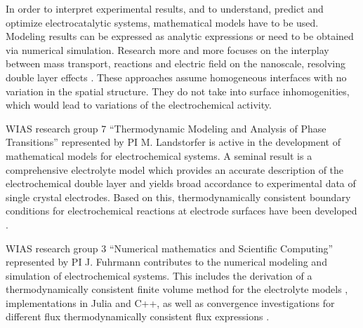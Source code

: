 \documentclass[a4paper,10pt]{article}
\begin{document}

In order to interpret experimental results, and to understand, predict and optimize electrocatalytic systems, mathematical models have to be used.
Modeling results can be expressed as analytic expressions or need to be obtained via numerical simulation.
Research more and more focuses on the interplay between mass transport, reactions and  electric field on the nanoscale, resolving double layer effects \cite{lin2019understanding,tan2018double,eden2019modeling,bohra2019modeling}.
%
These approaches assume homogeneous interfaces with no variation in the spatial structure. They do not take into surface inhomogenities, which would lead to variations of the electrochemical activity.


WIAS research group 7 ``Thermodynamic Modeling and Analysis of Phase Transitions'' represented by PI M. Landstorfer is active in the development of mathematical models for electrochemical systems.  A seminal result is a comprehensive electrolyte model which provides an accurate description of the electrochemical double layer and yields broad accordance to experimental data of single crystal electrodes. Based on this, thermodynamically consistent boundary conditions for electrochemical reactions at electrode surfaces have been developed \cite{DGM2013,DGL2014,Landstorfer2016187,landstorfer2017boundary}.

WIAS research group 3 ``Numerical mathematics and Scientific Computing'' represented by PI J. Fuhrmann contributes to the numerical modeling and simulation of electrochemical systems. This includes  the derivation of a thermodynamically consistent finite volume method \cite{JF2016} for the electrolyte models \cite{DGL2014,VagnerEtAl2019}, implementations in Julia and C++, as well as convergence investigations for  different flux thermodynamically consistent flux expressions \cite{CCFG2020}.   %
\end{document}
